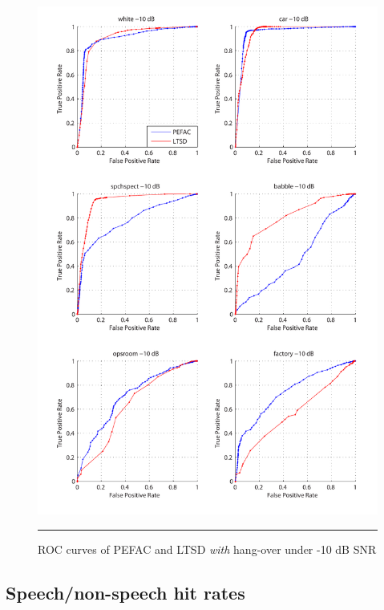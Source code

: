 \begin{figure}[htbp]
	\centering
		\includegraphics[width=1.0\columnwidth]{Figures/Chapter5/pefacm10.pdf}
		\rule{37em}{0.5pt}
	\caption[ROC curves of PEFAC and LTSD \emph{with} hang-over under -10 dB SNR]{ROC curves of PEFAC and LTSD \emph{with} hang-over under -10 dB SNR}
	\label{fig:pefacm10}
\end{figure}


\subsection{Speech/non-speech hit rates}

